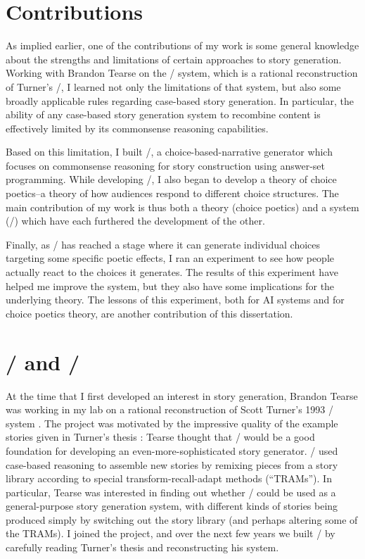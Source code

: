 \section{Contributions}

As implied earlier, one of the contributions of my work is some general knowledge about the strengths and limitations of certain approaches to story generation.
%
Working with Brandon Tearse on the \skald/ system, which is a rational reconstruction of Turner's \minstrel/, I learned not only the limitations of that system, but also some broadly applicable rules regarding case-based story generation.
%
In particular, the ability of any case-based story generation system to recombine content is effectively limited by its commonsense reasoning capabilities.


Based on this limitation, I built \dunyazad/, a choice-based-narrative generator which focuses on commonsense reasoning for story construction using answer-set programming.
%
While developing \dunyazad/, I also began to develop a theory of choice poetics--a theory of how audiences respond to different choice structures.
%
The main contribution of my work is thus both a theory (choice poetics) and a system (\dunyazad/) which have each furthered the development of the other.


Finally, as \dunyazad/ has reached a stage where it can generate individual choices targeting some specific poetic effects, I ran an experiment to see how people actually react to the choices it generates.
%
The results of this experiment have helped me improve the system, but they also have some implications for the underlying theory.
%
The lessons of this experiment, both for AI systems and for choice poetics theory, are another contribution of this dissertation.



\section{\minstrel/ and \skald/}

At the time that I first developed an interest in story generation, Brandon Tearse was working in my lab on a rational reconstruction of Scott Turner's 1993 \minstrel/ system \citep{Turner1993}.
%
The project was motivated by the impressive quality of the example stories given in Turner's thesis \citep{Turner1993}: Tearse thought that \minstrel/ would be a good foundation for developing an even-more-sophisticated story generator.
%
\minstrel/ used case-based reasoning to assemble new stories by remixing pieces from a story library according to special transform-recall-adapt methods (``TRAMs'').
%
In particular, Tearse was interested in finding out whether \minstrel/ could be used as a general-purpose story generation system, with different kinds of stories being produced simply by switching out the story library (and perhaps altering some of the TRAMs).
%
I joined the project, and over the next few years we built \skald/ by carefully reading Turner's thesis and reconstructing his system.


